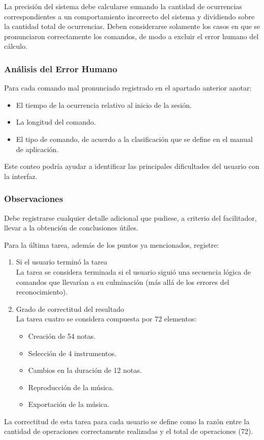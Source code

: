 La precisi\'on del sistema debe calcularse sumando la cantidad de ocurrencias correspondientes a un 
comportamiento incorrecto del sistema y dividiendo sobre la cantidad total de ocurrencias.
Deben considerarse solamente los casos en que se pronunciaron correctamente los comandos, de modo a 
excluir el error humano del c\'alculo.


\subsubsection{An\'alisis del Error Humano}
Para cada comando mal pronunciado registrado en el apartado anterior anotar:
\begin{itemize}
    \item El tiempo de la ocurrencia relativo al inicio de la sesión.
    \item La longitud del comando.
    \item El tipo de comando, de acuerdo a la clasificación que se define en el manual de aplicación.
\end{itemize}

Este conteo podr\'ia ayudar a identificar las principales dificultades del usuario con la interfaz.

\subsubsection{Observaciones}

Debe registrarse cualquier detalle adicional que pudiese, a criterio del facilitador, llevar a la 
obtenci\'on de conclusiones \'utiles.

Para la \'ultima tarea, adem\'as de los puntos ya mencionados, registre:
\begin{enumerate}
    \item Si el usuario termin\'o la tarea \\
    La tarea se considera terminada si el usuario sigui\'o una secuencia l\'ogica de comandos que 
    llevar\'ian a su culminaci\'on (m\'as all\'a de los errores del reconocimiento).
    \item Grado de correctitud del resultado \\
    La tarea cuatro se considera compuesta por 72 elementos:
    \begin{itemize}
        \item Creaci\'on de 54 notas.
        \item Selecci\'on de 4 instrumentos.
        \item Cambios en la duraci\'on de 12 notas.
        \item Reproducci\'on de la m\'usica.
        \item Exportaci\'on de la m\'usica.
    \end{itemize}

\end{enumerate}

La correctitud de esta tarea para cada usuario se define como la raz\'on entre la cantidad de 
operaciones correctamente realizadas y el total de operaciones (72).
